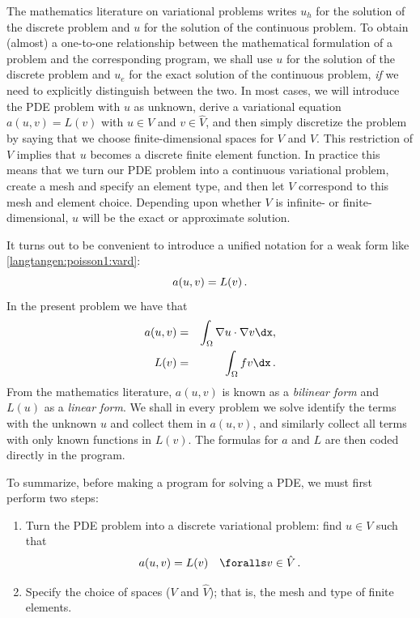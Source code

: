 The mathematics literature on variational problems writes $u_h$ for
the solution of the discrete problem and $u$ for the solution of the
continuous problem. To obtain (almost) a one-to-one relationship
between the mathematical formulation of a problem and the
corresponding \fenics{} program, we shall use $u$ for the solution of
the discrete problem and $u_{e}$ for the exact solution of the
continuous problem, \emph{if} we need to explicitly distinguish
between the two.  In most cases, we will introduce the PDE problem
with $u$ as unknown, derive a variational equation $a(u,v)=L(v)$ with
$u\in V$ and $v\in \hat V$, and then simply discretize the problem by
saying that we choose finite-dimensional spaces for $V$ and $\hat
V$. This restriction of $V$ implies that $u$ becomes a discrete finite
element function. In practice this means that we turn our PDE problem
into a continuous variational problem, create a mesh and specify an
element type, and then let $V$ correspond to this mesh and element
choice.  Depending upon whether $V$ is infinite- or
finite-dimensional, $u$ will be the exact or approximate solution.

It turns out to be convenient to
introduce a unified notation for a weak form
like \eqref{langtangen:poisson1:vard}:
\begin{equation}
a(u, v) = L(v)\thinspace .
\end{equation}
In the present problem we have that
\begin{eqnarray}
a(u, v) &=& \int_{\Omega} \nabla u \cdot \nabla v \dx,
\label{langtangen:poisson1:vard:a}\\
L(v) &=& \int_{\Omega} fv \dx\langtangenep\label{langtangen:poisson1:vard:L}
\end{eqnarray}
From the mathematics literature,
$a(u,v)$ is known as a \emph{bilinear form} and $L(u)$ as a
\emph{linear form}.
We shall in every problem we solve identify the terms with the
unknown $u$ and collect them in $a(u,v)$, and similarly collect
all terms with only known functions in $L(v)$. The formulas for $a$ and
$L$ are then coded directly in the program.

To summarize, before making a \fenics{} program for solving a PDE,
we must first perform two steps:
\begin{enumerate}
\item Turn the PDE problem into a discrete
variational problem: find $u\in V$
such that
\[ a(u,v) = L(v)\quad\foralls v\in \hat{V}\langtangenep \]
\item Specify the choice of spaces ($V$ and $\hat V$); that is,
the mesh and type of finite elements.
\end{enumerate}

